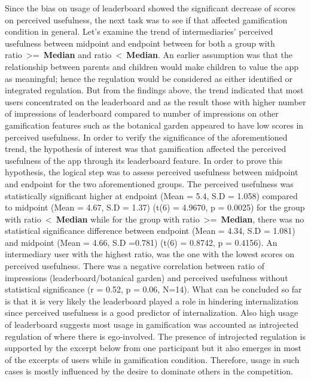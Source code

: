 Since the bias on usage of leaderboard showed the significant decrease of scores on perceived usefulness, the next task was to see if that affected gamification condition in general. Let's examine the trend of intermediaries' perceived usefulness between midpoint and endpoint between for both a group with ratio~\textgreater=~\textbf{Median} and ratio~\textless~\textbf{Median}. An earlier assumption was that the relationship between parents and children would make children to value the app as meaningful; hence the regulation would be considered as either identified or integrated regulation. But from the findings above, the trend indicated that most users concentrated on the leaderboard and as the result those with higher number of impressions of leaderboard compared to number of impressions on other gamification features such as the botanical garden appeared to have low scores in perceived usefulness. In order to verify the significance of the aforementioned trend,  the hypothesis of interest was that gamification affected the perceived usefulness of the app through its leaderboard feature. In order to prove this hypothesis, the logical step was to assess perceived usefulness between midpoint and endpoint for the two aforementioned groups. The perceived usefulness was statistically significant higher at endpoint (Mean = 5.4, S.D = 1.058) compared to midpoint (Mean = 4.67, S.D = 1.37) (t(6) = 4.9670, p = 0.0025) for the group with ratio~\textless~\textbf{Median} while for the group with ratio~\textgreater=~\textbf{Median}, there was no statistical significance difference between endpoint (Mean = 4.34, S.D = 1.081) and midpoint (Mean = 4.66, S.D =0.781) (t(6) = 0.8742, p =  0.4156). An intermediary user with the highest ratio, was the one with the lowest scores on perceived usefulness. There was a negative correlation between ratio of impressions (leaderboard/botanical garden) and perceived usefulness without statistical significance (r = 0.52, p = 0.06, N=14). What can be concluded so far is that it is very likely the leaderboard played a role in hindering internalization since perceived usefulness is a good predictor of internalization.  Also high usage of leaderboard suggests most usage in gamification was accounted as introjected regulation of where there is ego-involved. The presence of introjected regulation is supported by the excerpt below from one participant but it also emerges in most of the excerpts of users while in gamification condition. Therefore, usage in such cases is mostly influenced by the desire to dominate others in the competition.

